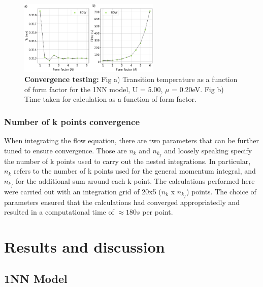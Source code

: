 \documentclass[12pt]{article}
\begin{document}
\begin{figure}[htbp]  %
    \centering
    \includegraphics[width=0.6\textwidth]{convergence.png}  %
    \caption{\textbf{Convergence testing:} Fig a) Transition temperature as a function of form factor for the 1NN model, U = 5.00, $\mu$ = 0.20eV. Fig b) Time taken for calculation
    as a function of form factor.   }
    \label{fig:Formfactorconvergence}
\end{figure}

\newpage





\subsubsection{Number of k points convergence }

When integrating the flow equation, there are two parameters that can be further tuned to ensure convergence.
Those are $n_k$ and $n_{k_f}$ and  loosely speaking specify the number of k points used to carry out the nested integrations. 
In particular, $n_k$ refers to the number of k points used for the general momentum integral, and $n_{k_f}$ for 
the additional sum around each k-point. The calculations performed here were carried out with an integration 
grid of 20x5 ($n_k$ x $n_{k_f}$) points. The choice of parameters ensured that the calculations had converged appropriatedly 
and resulted in a computational time of $\approx 180s$ per point. 


\section{Results and discussion}

\subsection{1NN Model}
\label{subsec:1NNModel}
\end{document}

